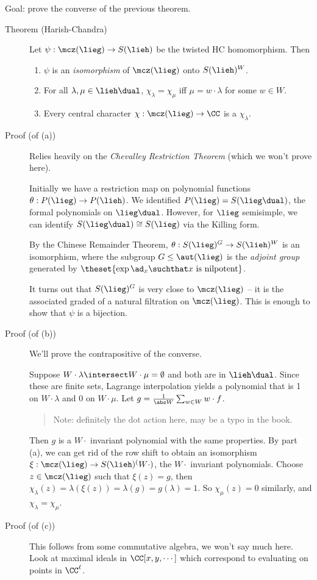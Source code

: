 Goal: prove the converse of the previous theorem.

\begin{description}
\item[Theorem (Harish-Chandra)]
Let \(\psi: \mcz(\lieg) \to S(\lieh)\) be the twisted HC homomorphism.
Then

\begin{enumerate}
\def\labelenumi{\alph{enumi}.}
\item
  \(\psi\) is an \emph{isomorphism} of \(\mcz(\lieg)\) onto
  \(S(\lieh)^W\).
\item
  For all \(\lambda, \mu \in \lieh\dual\), \(\chi_\lambda = \chi_\mu\)
  iff \(\mu = w\cdot \lambda\) for some \(w\in W\).
\item
  Every central character \(\chi: \mcz(\lieg) \to \CC\) is a
  \(\chi_\lambda\).
\end{enumerate}
\item[Proof (of (a))]
Relies heavily on the \emph{Chevalley Restriction Theorem} (which we
won't prove here).

Initially we have a restriction map on polynomial functions
\(\theta: P(\lieg) \to P(\lieh)\). We identified
\(P(\lieg) = S(\lieg\dual)\), the formal polynomials on \(\lieg\dual\).
However, for \(\lieg\) semisimple, we can identify
\(S(\lieg\dual) \cong S(\lieg)\) via the Killing form.

By the Chinese Remainder Theorem, \(\theta: S(\lieg)^G \to S(\lieh)^W\)
is an isomorphism, where the subgroup \(G \leq \aut(\lieg)\) is the
\emph{adjoint group} generated by
\(\theset{\exp \ad_x \suchthat x \text{ is nilpotent}}\).

It turns out that \(S(\lieg)^G\) is very close to \(\mcz(\lieg)\) -- it
is the associated graded of a natural filtration on \(\mcz(\lieg)\).
This is enough to show that \(\psi\) is a bijection.
\item[Proof (of (b))]
We'll prove the contrapositive of the converse.

Suppose \(W\cdot \lambda \intersect W\cdot \mu = \emptyset\) and both
are in \(\lieh\dual\). Since these are finite sets, Lagrange
interpolation yields a polynomial that is 1 on \(W\cdot \lambda\) and 0
on \(W\cdot \mu\). Let \(g = \frac{1}{\abs W} \sum_{w\in W} w\cdot f\).

\begin{quote}
Note: definitely the dot action here, may be a typo in the book.
\end{quote}

Then \(g\) is a \(W\cdot\) invariant polynomial with the same
properties. By part (a), we can get rid of the row shift to obtain an
isomorphism \(\xi: \mcz(\lieg) \to S(\lieh)^(W\cdot)\), the \(W\cdot\)
invariant polynomials. Choose \(z\in \mcz(\lieg)\) such that
\(\xi(z) = g\), then
\(\chi_\lambda(z) = \lambda(\xi(z)) = \lambda(g) = g(\lambda) = 1\). So
\(\chi_\mu(z) = 0\) similarly, and \(\chi_\lambda = \chi_\mu\).
\item[Proof (of (c))]
This follows from some commutative algebra, we won't say much here. Look
at maximal ideals in \(\CC[x, y,\cdots]\) which correspond to evaluating
on points in \(\CC^\ell\).
\end{description}

